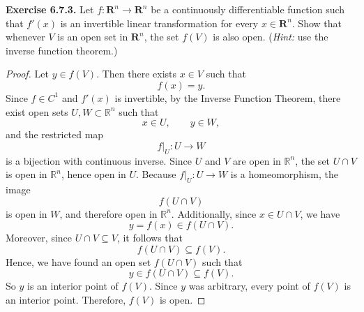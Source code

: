 \begin{problem}
    \textbf{Exercise 6.7.3.}
    Let $f:\mathbf{R}^n\to\mathbf{R}^n$ be a continuously differentiable function such that
    $f'(x)$ is an invertible linear transformation for every $x\in\mathbf{R}^n$.
    Show that whenever $V$ is an open set in $\mathbf{R}^n$, the set $f(V)$ is also open.
    (\emph{Hint:} use the inverse function theorem.)
\end{problem}

\begin{proof}
Let \(y \in f(V)\). Then there exists \(x \in V\) such that
\[
f(x)=y.
\]
Since \(f \in C^1\) and \(f'(x)\) is invertible, by the Inverse Function Theorem, there exist open sets \(U,W \subset \mathbb{R}^n\) such that
\[
x \in U, \qquad y \in W,
\]
and the restricted map
\[
f|_U : U \to W
\]
is a bijection with continuous inverse.
Since \(U\) and \(V\) are open in \(\mathbb{R}^n\), the set \(U \cap V\) is open in \(\mathbb{R}^n\), hence open in \(U\). Because \(f|_U : U \to W\) is a homeomorphism, the image
\[
f(U \cap V)
\]
is open in \(W\), and therefore open in \(\mathbb{R}^n\).
Additionally, since \(x \in U \cap V\), we have
\[
y=f(x)\in f(U \cap V).
\]
Moreover, since \(U \cap V \subseteq V\), it follows that
\[
f(U \cap V)\subseteq f(V).
\]
Hence, we have found an open set \(f(U \cap V)\) such that
\[
y \in f(U \cap V)\subseteq f(V).
\]
So \(y\) is an interior point of \(f(V)\). Since \(y\) was arbitrary, every point of \(f(V)\) is an interior point. Therefore, \(f(V)\) is open.
\end{proof}


